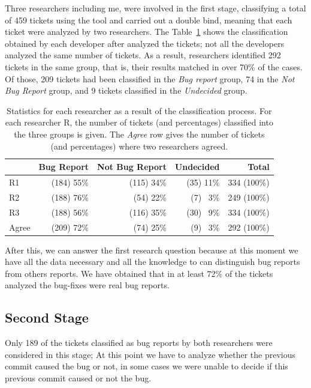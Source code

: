 \documentclass[ifip]{svmult}
\begin{document}
Three researchers including me, were involved in the first stage, classifying a total of 459 tickets using the tool and carried out a double bind, meaning that each ticket were analyzed by two researchers. The Table~\ref{tab:2} shows the classification obtained by each developer after analyzed the tickets; not all the developers analyzed the same number of tickets. As a result, researchers identified 292 tickets in the same group, that is, their results matched in over 70\% of the cases. Of those, 209 tickets had been classified in the \emph{Bug report} group, 74 in the \emph{Not Bug Report} group, and 9 tickets classified in the \emph{Undecided} group.

\begin{table}
\centering
\begin{tabular}{l|rrr|r}
\toprule[0.3mm]%
  & Bug Report & Not Bug Report & Undecided & Total \\\hline
R1  & (184) 55\% & (115) 34\% & (35) 11\% & 334 (100\%) \\
R2  & (188) 76\% & (54) 22\% & (7) ~3\% & 249 (100\%) \\
R3 & (188) 56\% & (116) 35\% & (30) ~9\% & 334 (100\%) \\ \hline
Agree & (209) 72\% & (74) 25\% & (9) ~3\% & 292 (100\%) \\
\bottomrule[0.3mm]
\end{tabular} %
\caption{Statistics for each researcher as a result of the classification process. For each researcher R, the number of tickets (and percentages) classified into the three groups is given. The \emph{Agree} row gives the number of tickets (and percentages) where two researchers agreed.}
\label{tab:2}
\end{table}


After this, we can answer the first research question because at this moment we have all the data necessary and all the knowledge to can distinguish bug reports from others reports. We have obtained that in at least 72\% of the tickets analyzed the bug-fixes were real bug reports.


\subsection{Second Stage}
\label{sec:resultsSS}

Only 189 of the tickets classified as bug reports by both researchers were considered in this stage; At this point we have to analyze whether the previous commit caused the bug or not, in some cases we were unable to decide if this previous commit caused or not the bug.
\end{document}
